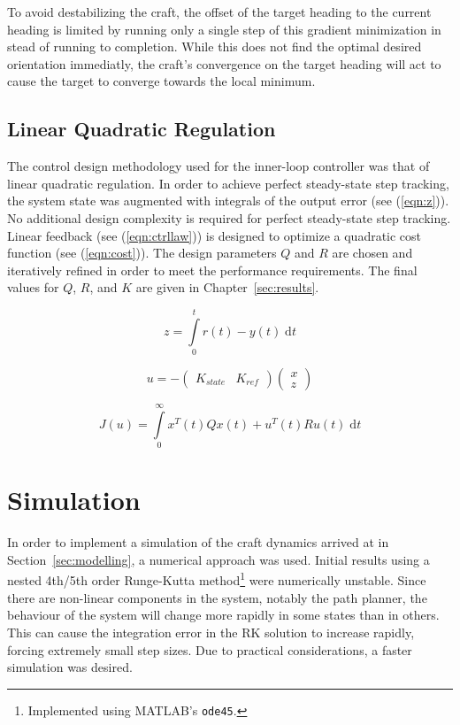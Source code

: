 \documentclass{sydeStyle}
\begin{document}
To avoid destabilizing the craft, the offset of the target heading to the
current heading is limited by running only a single step of this gradient
minimization in stead of running to completion. While this does not find the
optimal desired orientation immediatly, the craft's convergence on the target
heading will act to cause the target to converge towards the local minimum.

\subsection{Linear Quadratic Regulation}
\label{sec:lqr}
The control design methodology used for the inner-loop controller was that of
linear quadratic regulation.  In order to achieve perfect steady-state step
tracking, the system state was augmented with integrals of the output error (see
(\ref{eqn:z})).  No additional design complexity is required for perfect
steady-state step tracking.  Linear feedback (see (\ref{eqn:ctrllaw})) is
designed to optimize a quadratic cost function (see (\ref{eqn:cost})).  The
design parameters $Q$ and $R$ are chosen and iteratively refined in order to
meet the performance requirements.  The final values for $Q$, $R$, and $K$ are
given in Chapter~\ref{sec:results}.

\begin{equation}
    z = \int\limits_0^t r(t) - y(t) \; \textrm{d}t
    \label{eqn:z}
\end{equation}

\begin{equation}
    u
    =
    -
    \begin{pmatrix}
        K_{state} & K_{ref}
    \end{pmatrix}
    \begin{pmatrix}
        x \\ z
    \end{pmatrix}
    \label{eqn:ctrllaw}
\end{equation}

\begin{equation}
    J(u) = \int\limits_0^\infty x^T(t)Qx(t) + u^T(t)Ru(t) \; \textrm{d}t
    \label{eqn:cost}
\end{equation}

\section{Simulation}
\label{sec:simulation}
In order to implement a simulation of the craft dynamics arrived at in
Section~\ref{sec:modelling}, a numerical approach was used.  Initial results
using a nested 4th/5th order Runge-Kutta method\footnote{Implemented using
MATLAB's \texttt{ode45}.} were numerically unstable.  Since there are non-linear
components in the system, notably the path planner, the behaviour of the system
will change more rapidly in some states than in others.  This can cause the
integration error in the RK solution to increase rapidly, forcing extremely
small step sizes.  Due to practical considerations, a faster simulation was
desired.
\end{document}
